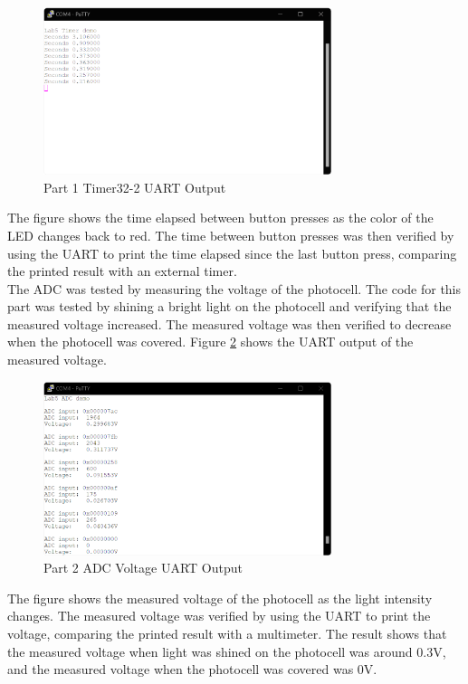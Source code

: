 \documentclass[CMPE]{KGCOEReport}
\begin{document}
\begin{figure}[H]
    \centering
    \includegraphics[width=0.75\textwidth]{part1.png}
    \caption{Part 1 Timer32-2 UART Output}
    \label{fig:part1}
\end{figure}

The figure shows the time elapsed between button presses as the color of the LED changes back to red. The time between button presses was then verified by using the UART to print the time elapsed since the last button press, comparing the printed result with an external timer.\\

The ADC was tested by measuring the voltage of the photocell. The code for this part was tested by shining a bright light on the photocell and verifying that the measured voltage increased. The measured voltage was then verified to decrease when the photocell was covered. Figure \ref{fig:part2a} shows the UART output of the measured voltage.

\begin{figure}[H]
    \centering
    \includegraphics[width=0.75\textwidth]{part2a.png}
    \caption{Part 2 ADC Voltage UART Output}
    \label{fig:part2a}
\end{figure}

The figure shows the measured voltage of the photocell as the light intensity changes. The measured voltage was verified by using the UART to print the voltage, comparing the printed result with a multimeter. The result shows that the measured voltage when light was shined on the photocell was around 0.3V, and the measured voltage when the photocell was covered was 0V.\\
\end{document}
